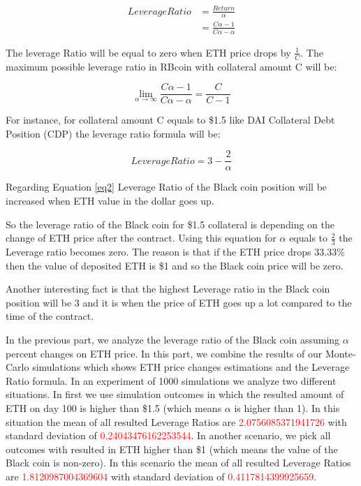 \begin{equation} \label{eq2}
\begin{split}
Leverage Ratio & = \frac{Return}{\alpha} \\
 & = \frac{C\alpha-1}{C\alpha-\alpha}
\end{split}
\end{equation}

The leverage Ratio will be equal to zero when ETH price drops by $ \frac{1}{C} $. The maximum possible leverage ratio in RBcoin with collateral amount C will be:

$$\lim_{\alpha\to\infty} \frac{C\alpha-1}{C\alpha-\alpha} = \frac{C}{C-1}$$

For instance, for collateral amount C equals to \$1.5 like DAI Collateral Debt Position (CDP) the leverage ratio formula will be:

\[Leverage Ratio = 3- \frac{2}{\alpha}\]


Regarding Equation \ref{eq2} Leverage Ratio of the Black coin position will be increased when ETH value in the dollar goes up.

So the leverage ratio of the Black coin for \$1.5 collateral is depending on the change of ETH price after the contract. Using this equation for $\alpha$ equals to $\frac{2}{3} $ the Leverage ratio becomes zero. The reason is that if the ETH price drops 33.33\% then the value of deposited ETH is \$1 and so the Black coin price will be zero. 

Another interesting fact is that the highest Leverage ratio in the Black coin position will be 3 and it is when the price of ETH goes up a lot compared to the time of the contract.

In the previous part, we analyze the leverage ratio of the Black coin assuming $\alpha$ percent changes on ETH price. In this part, we combine the results of our Monte-Carlo simulations which shows ETH price changes estimations and the Leverage Ratio formula. 
In an experiment of 1000 simulations we analyze two different situations. In first we use simulation outcomes in which the resulted amount of ETH on day 100 is higher than \$1.5 (which means $\alpha$ is higher than 1). In this situation the mean of all resulted Leverage Ratios are \textcolor{red}{2.0756085371941726} with standard deviation of \textcolor{red}{0.24043476162253544}. In another scenario, we pick all outcomes with resulted in ETH higher than \$1 (which means the value of the Black coin is non-zero). In this scenario  the mean of all resulted Leverage Ratios are \textcolor{red}{1.8120987004369604} with standard deviation of \textcolor{red}{0.4117814399925659}.

